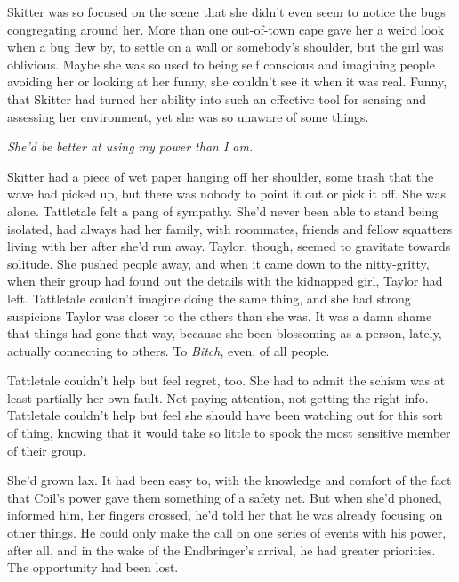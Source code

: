 Skitter was so focused on the scene that she didn't even seem to notice the bugs congregating around her.  More than one out-of-town cape gave her a weird look when a bug flew by, to settle on a wall or somebody's shoulder, but the girl was oblivious.  Maybe she was so used to being self conscious and imagining people avoiding her or looking at her funny, she couldn't see it when it was real.  Funny, that Skitter had turned her ability into such an effective tool for sensing and assessing her environment, yet she was so unaware of some things.



\emph{She'd be better at using my power than I am.}



Skitter had a piece of wet paper hanging off her shoulder, some trash that the wave had picked up, but there was nobody to point it out or pick it off.  She was alone.  Tattletale felt a pang of sympathy.  She'd never been able to stand being isolated, had always had her family, with roommates, friends and fellow squatters living with her after she'd run away.  Taylor, though, seemed to gravitate towards solitude.  She pushed people away, and when it came down to the nitty-gritty, when their group had found out the details with the kidnapped girl, Taylor had left.  Tattletale couldn't imagine doing the same thing, and she had strong suspicions Taylor was closer to the others than she was.  It was a damn shame that things had gone that way, because she been blossoming as a person, lately, actually connecting to others.  To \emph{Bitch}, even, of all people.



Tattletale couldn't help but feel regret, too.  She had to admit the schism was at least partially her own fault.  Not paying attention, not getting the right info.  Tattletale couldn't help but feel she should have been watching out for this sort of thing, knowing that it would take so little to spook the most sensitive member of their group.



She'd grown lax.  It had been easy to, with the knowledge and comfort of the fact that Coil's power gave them something of a safety net.   But when she'd phoned, informed him, her fingers crossed, he'd told her that he was already focusing on other things.  He could only make the call on one series of events with his power, after all, and in the wake of the Endbringer's arrival, he had greater priorities.  The opportunity had been lost.



